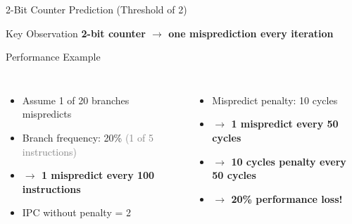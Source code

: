 \documentclass[aspectratio=169,12pt]{beamer}
\begin{document}
\begin{frame}{2-Bit Counter Prediction (Threshold of 2)}

\vspace{-0.2cm}
\begin{alertblock}{Key Observation}
\centering
\textcolor{incorrectred}{\textbf{2-bit counter $\rightarrow$ one misprediction every iteration}}
\end{alertblock}

\vspace{-0.2cm}
\begin{block}{Performance Example}
\scriptsize
\begin{columns}[T]
\begin{itemize}
\item Assume 1 of 20 branches mispredicts\\
\item Branch frequency: 20\% \textcolor{gray}{(1 of 5 instructions)}
\item[] \textcolor{incorrectred}{\textbf{$\rightarrow$ 1 mispredict every 100 instructions}}
\item IPC without penalty = 2\\
\end{itemize}

\begin{itemize}
\item Mispredict penalty: 10 cycles
\item[] \textcolor{incorrectred}{\textbf{$\rightarrow$ 1 mispredict every 50 cycles}}
\item[] \textcolor{incorrectred}{\textbf{$\rightarrow$ 10 cycles penalty every 50 cycles}}
\item[] \textcolor{incorrectred}{\textbf{$\rightarrow$ 20\% performance loss!}}
\end{itemize}
\end{columns}
\end{block}

\end{frame}
\end{document}
